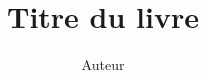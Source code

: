 \documentclass[11pt,a4paper,oneside]{book}
\author{Auteur}
\title{Titre du livre}
\date{}
\begin{document}
	
 

	

\frontmatter

\tableofcontents
 
%



\mainmatter











\nocite{*}


\end{document}
